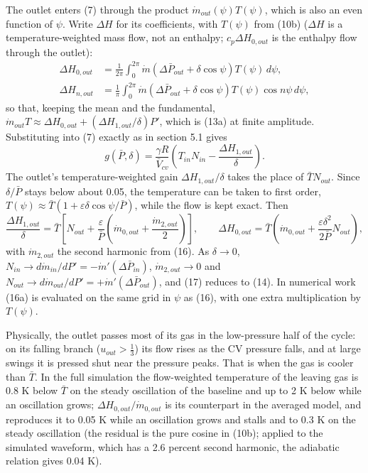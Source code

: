 \documentclass[11pt]{article}
\begin{document}
The outlet enters (7) through the product $\dot m_{out}(\psi)T(\psi)$, which is also an even function of $\psi$. Write $\Delta H$ for its coefficients, with $T(\psi)$ from (10b) ($\Delta H$ is a temperature-weighted mass flow, not an enthalpy; $c_p\Delta H_{0,out}$ is the enthalpy flow through the outlet):
\begin{equation}
\begin{aligned}
\Delta H_{0,out} &= \frac{1}{2\pi}\int_0^{2\pi}\dot m\left(\Delta\bar P_{out} + \delta\cos\psi\right)T(\psi)\,d\psi, \\
\Delta H_{n,out} &= \frac{1}{\pi}\int_0^{2\pi}\dot m\left(\Delta\bar P_{out} + \delta\cos\psi\right)T(\psi)\cos n\psi\,d\psi ,
\end{aligned} \tag{16a}
\end{equation}
so that, keeping the mean and the fundamental, $\dot m_{out}T \approx \Delta H_{0,out} + (\Delta H_{1,out}/\delta)P'$, which is (13a) at finite amplitude. Substituting into (7) exactly as in section 5.1 gives
\begin{equation}
g(\bar P,\delta) = \frac{\gamma R}{\bar V_{cv}}\left(T_{in}N_{in} - \frac{\Delta H_{1,out}}{\delta}\right) . \tag{17}
\end{equation}
The outlet's temperature-weighted gain $\Delta H_{1,out}/\delta$ takes the place of $\bar TN_{out}$. Since $\delta/\bar P$ stays below about 0.05, the temperature can be taken to first order, $T(\psi) \approx \bar T(1 + \varepsilon\delta\cos\psi/\bar P)$, while the flow is kept exact. Then
\begin{equation}
\frac{\Delta H_{1,out}}{\delta} = \bar T\left[N_{out} + \frac{\varepsilon}{\bar P}\left(\dot m_{0,out} + \frac{\dot m_{2,out}}{2}\right)\right], \qquad
\Delta H_{0,out} = \bar T\left(\dot m_{0,out} + \frac{\varepsilon\delta^2}{2\bar P}N_{out}\right) , \tag{17a}
\end{equation}
with $\dot m_{2,out}$ the second harmonic from (16). As $\delta \to 0$, $N_{in} \to d\dot m_{in}/dP' = -\dot m'(\Delta\bar P_{in})$, $\dot m_{2,out} \to 0$ and $N_{out} \to d\dot m_{out}/dP' = +\dot m'(\Delta\bar P_{out})$, and (17) reduces to (14). In numerical work (16a) is evaluated on the same grid in $\psi$ as (16), with one extra multiplication by $T(\psi)$.

Physically, the outlet passes most of its gas in the low-pressure half of the cycle: on its falling branch ($u_{out} > \tfrac13$) its flow rises as the CV pressure falls, and at large swings it is pressed shut near the pressure peaks. That is when the gas is cooler than $\bar T$. In the full simulation the flow-weighted temperature of the leaving gas is 0.8 K below $\bar T$ on the steady oscillation of the baseline and up to 2 K below while an oscillation grows; $\Delta H_{0,out}/\dot m_{0,out}$ is its counterpart in the averaged model, and reproduces it to 0.05 K while an oscillation grows and stalls and to 0.3 K on the steady oscillation (the residual is the pure cosine in (10b); applied to the simulated waveform, which has a 2.6 percent second harmonic, the adiabatic relation gives 0.04 K).
\end{document}
